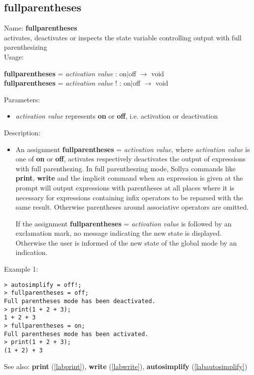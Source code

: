 \subsection{fullparentheses}
\label{labfullparentheses}
\noindent Name: \textbf{fullparentheses}\\
activates, deactivates or inspects the state variable controlling output with full parenthesizing\\

\noindent Usage: 
\begin{center}
\textbf{fullparentheses} = \emph{activation value} : \textsf{on$|$off} $\rightarrow$ \textsf{void}\\
\textbf{fullparentheses} = \emph{activation value} ! : \textsf{on$|$off} $\rightarrow$ \textsf{void}\\
\end{center}
Parameters: 
\begin{itemize}
\item \emph{activation value} represents \textbf{on} or \textbf{off}, i.e. activation or deactivation
\end{itemize}
\noindent Description: \begin{itemize}

\item An assignment \textbf{fullparentheses} = \emph{activation value}, where \emph{activation value}
   is one of \textbf{on} or \textbf{off}, activates respectively deactivates the output
   of expressions with full parenthezing. In full parentheszing mode,
   Sollya commands like \textbf{print}, \textbf{write} and the implicit command when an
   expression is given at the prompt will output expressions with
   parentheses at all places where it is necessary for expressions
   containing infix operators to be reparsed with the same
   result. Otherwise parentheses around associative operators are
   omitted.
    
   If the assignment \textbf{fullparentheses} = \emph{activation value} is followed by an
   exclamation mark, no message indicating the new state is
   displayed. Otherwise the user is informed of the new state of the
   global mode by an indication.
\end{itemize}
\noindent Example 1: 
\begin{center}\begin{minipage}{15cm}\begin{Verbatim}[frame=single]
> autosimplify = off!;
> fullparentheses = off;
Full parentheses mode has been deactivated.
> print(1 + 2 + 3);
1 + 2 + 3
> fullparentheses = on;
Full parentheses mode has been activated.
> print(1 + 2 + 3);
(1 + 2) + 3
\end{Verbatim}
\end{minipage}\end{center}
See also: \textbf{print} (\ref{labprint}), \textbf{write} (\ref{labwrite}), \textbf{autosimplify} (\ref{labautosimplify})
